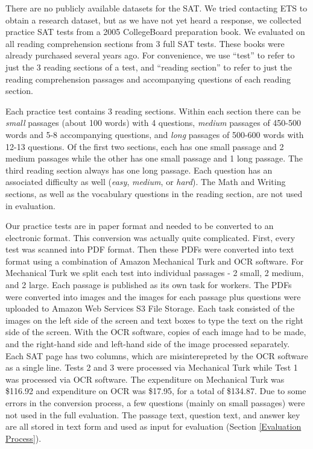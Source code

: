 \documentclass[pageno]{jpaper}
\begin{document}
There are no publicly available datasets for the SAT. We tried contacting ETS to
obtain a research dataset, but as we have not yet heard a response, we collected
practice SAT tests from a 2005 CollegeBoard preparation book. We evaluated on
all reading comprehension sections from 3 full SAT tests. These books were
already purchased several years ago. For convenience, we use ``test'' to refer
to just the 3 reading sections of a test, and ``reading section'' to refer to
just the reading comprehension passages and accompanying questions of each
reading section.

Each practice test contains 3 reading sections. Within each section there can be
\textit{small} passages (about 100 words) with 4 questions, \textit{medium}
passages of 450-500 words and 5-8 accompanying questions, and \textit{long}
passages of 500-600 words with 12-13 questions. Of the first two sections, each
has one small passage and 2 medium passages while the other has one small
passage and 1 long passage. The third reading section always has one long
passage. Each question has an associated difficulty as well (\textit{easy},
\textit{medium}, or \textit{hard}). The Math and Writing sections, as well as
the vocabulary questions in the reading section, are not used in evaluation.

Our practice tests are in paper format and needed to be converted to an
electronic format. This conversion was actually quite complicated. First, every
test was scanned into PDF format. Then these PDFs were converted into text
format using a combination of Amazon Mechanical Turk and OCR software. For
Mechanical Turk we split each test into individual passages - 2 small, 2 medium,
and 2 large. Each passage is published as its own task for workers. The PDFs
were converted into images and the images for each passage plus questions were
uploaded to Amazon Web Services S3 File Storage. Each task consisted of the
images on the left side of the screen and text boxes to type the text on the
right side of the screen. With the OCR software, copies of each image had to be
made, and the right-hand side and left-hand side of the image processed
separately. Each SAT page has two columns, which are misinterepreted by the OCR
software as a single line. Tests 2 and 3 were processed via Mechanical Turk
while Test 1 was processed via OCR software. The expenditure on Mechanical Turk
was \$116.92 and expenditure on OCR was \$17.95, for a total of \$134.87. Due to
some errors in the conversion process, a few questions (mainly on small
passages) were not used in the full evaluation. The passage text, question text,
and answer key are all stored in text form and used as input for evaluation
(Section \ref{Evaluation Process}).
\end{document}

